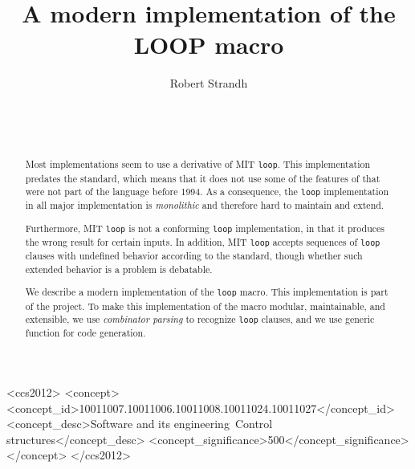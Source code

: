 \documentclass{sig-alternate-05-2015}
\def\inputtex#1{}
\def\mitloop{MIT \texttt{loop}}
\begin{document}
\title{A modern implementation of the LOOP macro}
\author{\alignauthor
Robert Strandh\\
\\
\\
\\
}

\maketitle

\begin{abstract}
Most \commonlisp{} implementations seem to use a derivative of
\mitloop{}.  This implementation predates the \commonlisp{} standard,
which means that it does not use some of the features of \commonlisp{}
that were not part of the language before 1994.  As a consequence, the
\texttt{loop} implementation in all major \commonlisp{} implementation
is \emph{monolithic} and therefore hard to maintain and extend.

Furthermore, \mitloop{} is not a conforming \texttt{loop}
implementation, in that it produces the wrong result for certain
inputs.  In addition, \mitloop{} accepts sequences of \texttt{loop}
clauses with undefined behavior according to the standard, though
whether such extended behavior is a problem is debatable.

We describe a modern implementation of the \commonlisp{} \texttt{loop}
macro.  This implementation is part of the \sicl{} project.  To make
this implementation of the macro modular, maintainable, and
extensible, we use \emph{combinator parsing} to recognize
\texttt{loop} clauses, and we use \clos{} generic function for code
generation.
\end{abstract}

\begin{CCSXML}
  <ccs2012>
  <concept>
  <concept_id>10011007.10011006.10011008.10011024.10011027</concept_id>
  <concept_desc>Software and its engineering~Control structures</concept_desc>
  <concept_significance>500</concept_significance>
  </concept>
  </ccs2012>
\end{CCSXML}


\printccsdesc


\inputtex{sec-introduction.tex}
\inputtex{sec-previous.tex}
\inputtex{sec-our-method.tex}
\inputtex{sec-benefits.tex}
\inputtex{sec-conclusions.tex}
\inputtex{sec-acknowledgments.tex}



\end{document}
